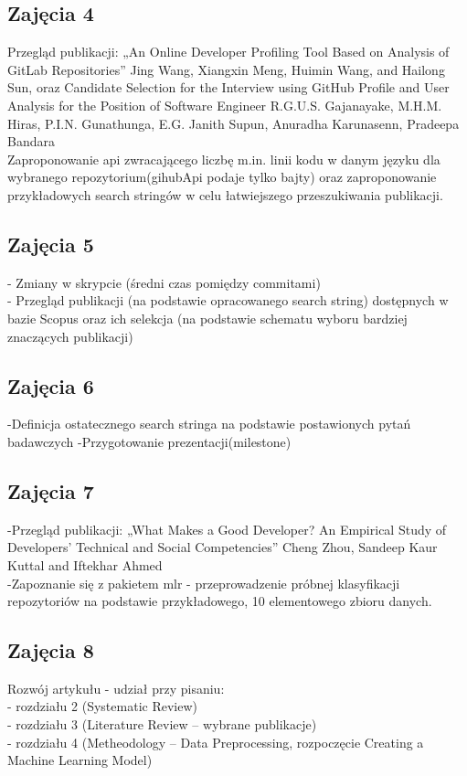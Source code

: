 \documentclass[graybox]{svmult}
\begin{document}
\subsection{Zajęcia 4}
Przegląd publikacji: „An Online Developer Profiling Tool Based on Analysis of GitLab Repositories” Jing Wang, Xiangxin Meng, Huimin Wang, and Hailong Sun, oraz Candidate Selection for the Interview using GitHub Profile and User Analysis for the Position of Software Engineer R.G.U.S. Gajanayake, M.H.M. Hiras, P.I.N. Gunathunga, E.G. Janith Supun, Anuradha Karunasenn, Pradeepa Bandara\\
Zaproponowanie api zwracającego liczbę m.in. linii kodu w danym języku dla wybranego repozytorium(gihubApi podaje tylko bajty) oraz zaproponowanie przykładowych search stringów w celu łatwiejszego przeszukiwania publikacji.

\subsection{Zajęcia 5}
- Zmiany w skrypcie (średni czas pomiędzy commitami)\\
- Przegląd publikacji (na podstawie opracowanego search string) dostępnych w bazie Scopus oraz ich selekcja (na podstawie schematu wyboru bardziej znaczących publikacji)

\subsection{Zajęcia 6}
-Definicja ostatecznego search stringa na podstawie postawionych pytań badawczych
-Przygotowanie prezentacji(milestone)

\subsection{Zajęcia 7}
-Przegląd publikacji: „What Makes a Good Developer? An Empirical Study of Developers' Technical and Social Competencies”  Cheng Zhou, Sandeep Kaur Kuttal and Iftekhar Ahmed\\
-Zapoznanie się z pakietem mlr - przeprowadzenie próbnej klasyfikacji repozytoriów na podstawie przykładowego, 10 elementowego zbioru danych.

\subsection{Zajęcia 8}
Rozwój artykułu - udział przy pisaniu:\\
- rozdziału 2 (Systematic Review)\\
- rozdziału 3 (Literature Review – wybrane publikacje)\\
- rozdziału 4 (Metheodology – Data Preprocessing, rozpoczęcie Creating a Machine Learning Model)
\end{document}
